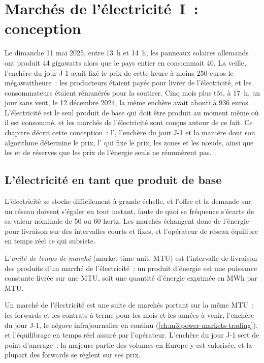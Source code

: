 \chapter{Marchés de l'électricité~I~: conception}\label{ch:m3:power-markets-design}

Le dimanche 11 mai 2025, entre 13~h et 14~h, les panneaux solaires allemands ont produit 44
gigawatts alors que le pays entier en consommait 40. La veille, l'enchère du jour J-1 avait fixé le prix de cette
heure à moins 250 euros le mégawattheure~: les producteurs étaient payés pour livrer
de l'électricité, et les consommateurs étaient rémunérés pour la soutirer. Cinq mois plus tôt, à 17~h, un
jour sans vent, le 12 décembre 2024, la même enchère avait abouti à 936 euros. L'électricité est le seul
produit de base qui doit être produit au moment même où il est consommé, et les marchés de l'électricité sont
conçus autour de ce fait. Ce chapitre décrit cette conception~: l',
l'enchère du jour J-1 et la manière dont son algorithme détermine le prix, l' qui fixe le prix, les zones et les nœuds, ainsi que les  et de réserves que les prix de l'énergie
seuls ne rémunèrent pas.

\section{L'électricité en tant que produit de base}

L'électricité se stocke difficilement à grande échelle, et l'offre et la demande sur un réseau doivent
s'égaler en tout instant, faute de quoi sa fréquence s'écarte de sa valeur nominale de 50 ou 60 hertz. Les
marchés échangent donc de l'énergie pour livraison sur des intervalles courts et fixes, et l'opérateur
de réseau équilibre en temps réel ce qui subsiste.

\begin{definition}\label{def:m3:power-markets-design:mtu}
L'\emph{unité de temps de marché} (market time unit, MTU) est l'intervalle de
livraison des produits d'un marché de l'électricité~: un produit d'énergie est une puissance constante livrée sur une
MTU, soit une quantité d'énergie exprimée en MWh par MTU.
\end{definition}

Un marché de l'électricité est une suite de marchés portant sur la même MTU~: les forwards et les
contrats à terme pour les mois et les années à venir, l'enchère du jour J-1, le négoce infrajournalier en continu
(\cref{ch:m3:power-markets-trading}), et l'équilibrage en temps réel assuré par l'opérateur. L'enchère du
jour J-1 sert de point d'ancrage~: la majeure partie des volumes en Europe y est valorisée, et la plupart
des forwards se règlent sur ses prix.

